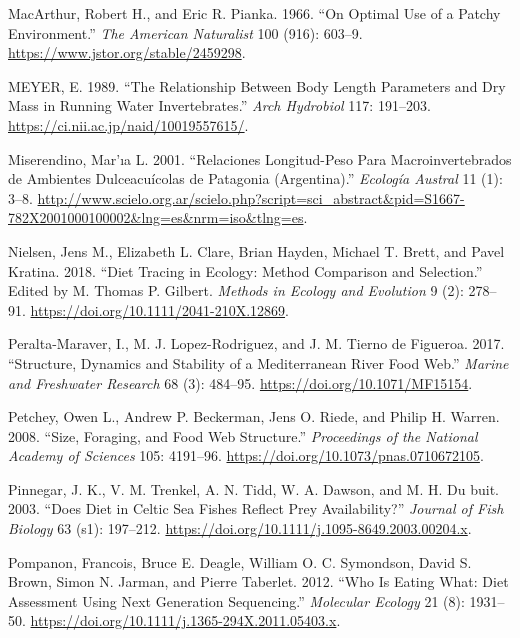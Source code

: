 \documentclass{article}
\newlength{\cslhangindent}
\newlength{\cslentryspacingunit} %
\newenvironment{CSLReferences}[2] %
 {%
  \setlength{\parindent}{0pt}
  \ifodd #1
  \let\oldpar\par
  \def\par{\hangindent=\cslhangindent\oldpar}
  \fi
  \setlength{\parskip}{#2\cslentryspacingunit}
 }%
 {}
\begin{document}
\begin{CSLReferences}{1}{0}
\leavevmode{}%
MacArthur, Robert H., and Eric R. Pianka. 1966. {``On {Optimal Use} of a
{Patchy Environment}.''} \emph{The American Naturalist} 100 (916):
603--9. \url{https://www.jstor.org/stable/2459298}.

\leavevmode{}%
MEYER, E. 1989. {``The Relationship Between Body Length Parameters and
Dry Mass in Running Water Invertebrates.''} \emph{Arch Hydrobiol} 117:
191--203. \url{https://ci.nii.ac.jp/naid/10019557615/}.

\leavevmode{}%
Miserendino, Mar'ıa L. 2001. {``Relaciones Longitud-Peso Para
Macroinvertebrados de Ambientes Dulceacuícolas de {Patagonia}
({Argentina}).''} \emph{Ecología Austral} 11 (1): 3--8.
\url{http://www.scielo.org.ar/scielo.php?script=sci_abstract\&pid=S1667-782X2001000100002\&lng=es\&nrm=iso\&tlng=es}.

\leavevmode{}%
Nielsen, Jens M., Elizabeth L. Clare, Brian Hayden, Michael T. Brett,
and Pavel Kratina. 2018. {``Diet Tracing in Ecology: Method Comparison
and Selection.''} Edited by M. Thomas P. Gilbert. \emph{Methods in
Ecology and Evolution} 9 (2): 278--91.
\url{https://doi.org/10.1111/2041-210X.12869}.

\leavevmode{}%
Peralta-Maraver, I., M. J. Lopez-Rodriguez, and J. M. Tierno de
Figueroa. 2017. {``Structure, Dynamics and Stability of a
{Mediterranean} River Food Web.''} \emph{Marine and Freshwater Research}
68 (3): 484--95. \url{https://doi.org/10.1071/MF15154}.

\leavevmode{}%
Petchey, Owen L., Andrew P. Beckerman, Jens O. Riede, and Philip H.
Warren. 2008. {``Size, Foraging, and Food Web Structure.''}
\emph{Proceedings of the National Academy of Sciences} 105: 4191--96.
\url{https://doi.org/10.1073/pnas.0710672105}.

\leavevmode{}%
Pinnegar, J. K., V. M. Trenkel, A. N. Tidd, W. A. Dawson, and M. H. Du
buit. 2003. {``Does Diet in {Celtic Sea} Fishes Reflect Prey
Availability?''} \emph{Journal of Fish Biology} 63 (s1): 197--212.
\url{https://doi.org/10.1111/j.1095-8649.2003.00204.x}.

\leavevmode{}%
Pompanon, Francois, Bruce E. Deagle, William O. C. Symondson, David S.
Brown, Simon N. Jarman, and Pierre Taberlet. 2012. {``Who Is Eating
What: Diet Assessment Using Next Generation Sequencing.''}
\emph{Molecular Ecology} 21 (8): 1931--50.
\url{https://doi.org/10.1111/j.1365-294X.2011.05403.x}.


\end{CSLReferences}
\end{document}
